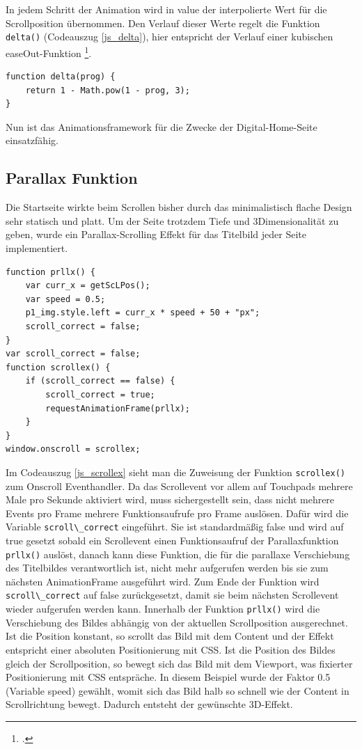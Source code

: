 In jedem Schritt der Animation wird in value der interpolierte Wert für die Scrollposition übernommen. Den Verlauf dieser Werte regelt die Funktion \lstinline{delta()} (Codeauszug \ref{js_delta}), hier entspricht der Verlauf einer kubischen easeOut-Funktion \footcite[vgl.][]{easeOut}.



\begin{lstlisting}[caption=Die Funktion delta., label=js_delta]
function delta(prog) {
	return 1 - Math.pow(1 - prog, 3);
}
\end{lstlisting}

Nun ist das Animationsframework für die Zwecke der Digital-Home-Seite einsatzfähig.

\subsection{Parallax Funktion}
Die Startseite wirkte beim Scrollen bisher durch das minimalistisch flache Design sehr statisch und platt. Um der Seite trotzdem Tiefe und 3Dimensionalität zu geben, wurde ein Parallax-Scrolling Effekt für das Titelbild jeder Seite implementiert.

\begin{lstlisting}[caption=Das Onscroll Event und die Parallax Callbackfunktion., label=js_scrollex]
function prllx() {
	var curr_x = getScLPos();
	var speed = 0.5;
	p1_img.style.left = curr_x * speed + 50 + "px";
	scroll_correct = false;
}
var scroll_correct = false;
function scrollex() {
	if (scroll_correct == false) {
		scroll_correct = true;
		requestAnimationFrame(prllx);
	}
}
window.onscroll = scrollex;
\end{lstlisting}

Im Codeauszug \ref{js_scrollex} sieht man die Zuweisung der Funktion \lstinline{scrollex()} zum Onscroll Eventhandler. Da das Scrollevent vor allem auf Touchpads mehrere Male pro Sekunde aktiviert wird, muss sichergestellt sein, dass nicht mehrere Events pro Frame mehrere Funktionsaufrufe pro Frame auslösen. Dafür wird die Variable \lstinline{scroll\_correct} eingeführt. Sie ist standardmäßig false und wird auf true gesetzt sobald ein Scrollevent einen Funktionsaufruf der Parallaxfunktion \lstinline{prllx()} auslöst, danach kann diese Funktion, die für die parallaxe Verschiebung des Titelbildes verantwortlich ist, nicht mehr aufgerufen werden bis sie zum nächsten AnimationFrame ausgeführt wird. Zum Ende der Funktion wird \lstinline{scroll\_correct} auf false zurückgesetzt, damit sie beim nächsten Scrollevent wieder aufgerufen werden kann. Innerhalb der Funktion \lstinline{prllx()} wird die Verschiebung des Bildes abhängig von der aktuellen Scrollposition ausgerechnet. Ist die Position konstant, so scrollt das Bild mit dem Content und der Effekt entspricht einer absoluten Positionierung mit CSS. Ist die Position des Bildes gleich der Scrollposition, so bewegt sich das Bild mit dem Viewport, was fixierter Positionierung mit CSS entspräche. In diesem Beispiel wurde der Faktor 0.5 (Variable speed) gewählt, womit sich das Bild halb so schnell wie der Content in Scrollrichtung bewegt. Dadurch entsteht der gewünschte 3D-Effekt.




